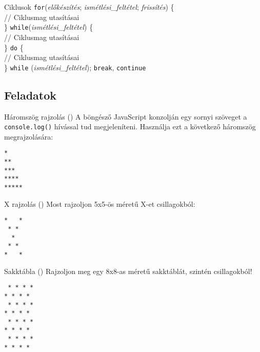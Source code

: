 \documentclass[usenames,dvipsnames,aspectratio=169]{beamer}
\begin{document}
\begin{frame}
    Ciklusok
    \vfill
    \texttt{for}(\emph{előkészítés}; \emph{ismétlési\_feltétel}; \emph{frissítés}) \{ \\
    \qquad // Ciklusmag utasításai \\
    \}
    \vfill
    \texttt{while}(\emph{ismétlési\_feltétel}) \{ \\
    \qquad // Ciklusmag utasításai \\
    \}
    \vfill
    \texttt{do} \{ \\
    \qquad // Ciklusmag utasításai \\
    \} \texttt{while} (\emph{ismétlési\_feltétel});
    \vfill
    \texttt{break}, \texttt{continue}
\end{frame}

\subsection{Feladatok}

\begin{frame}[fragile]
    \begin{exampleblock}{Háromszög rajzolás ()}
        A böngésző JavaScript konzolján egy sornyi szöveget a \texttt{console.log()} hívással tud megjeleníteni. Használja ezt a következő háromszög megrajzolására:\\
        \begin{verbatim}
*
**
***
****
*****                
\end{verbatim}
    \end{exampleblock}
\end{frame}

\begin{frame}[fragile]
    \begin{exampleblock}{X rajzolás ()}
        Most rajzoljon 5x5-ös méretű X-et csillagokból:\\
        \begin{verbatim}
*   *
 * *
  *
 * *
*   *            
\end{verbatim}
    \end{exampleblock}
\end{frame}

\begin{frame}[fragile]
    \begin{exampleblock}{Sakktábla ()}
        Rajzoljon meg egy 8x8-as méretű sakktáblát, szintén csillagokból!\\
        \begin{verbatim}
 * * * *
* * * *
 * * * *
* * * *
 * * * *
* * * *
 * * * *
* * * *
\end{verbatim}
    \end{exampleblock}
\end{frame}
\end{document}
